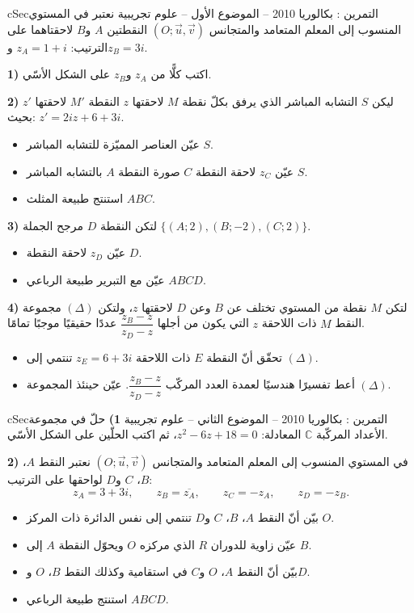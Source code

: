 \documentclass[12pt,a4paper]{article}
\newenvironment{BOX}[2]{\begin{otherlanguage}{english}\begin{arbox}{#1}{#2}}{\end{arbox}\end{otherlanguage}}
\newcounter{exo}
\newenvironment{tamrin}[1]{\stepcounter{exo}\begin{BOX}{cSec}{التمرين \theexo: #1}}{\end{BOX}}
\newenvironment{sq}{\begin{itemize}[leftmargin=2.4em,itemsep=3pt]}{\end{itemize}}
\newcommand{\qa}{\item[(أ)]}\newcommand{\qb}{\item[(ب)]}\newcommand{\qc}{\item[(جـ)]}\newcommand{\qd}{\item[(د)]}\newcommand{\qe}{\item[(هـ)]}
\begin{document}
\begin{tamrin}{بكالوريا 2010 -- الموضوع الأول -- علوم تجريبية}
نعتبر في المستوي المنسوب إلى المعلم المتعامد والمتجانس $(O;\vec u,\vec v)$ النقطتين $A$ و$B$ لاحقتاهما على الترتيب: $z_A=1+i$ و$z_B=3i$.

\textbf{1)} اكتب كلًّا من $z_A$ و$z_B$ على الشكل الأسّي.

\textbf{2)} ليكن $S$ التشابه المباشر الذي يرفق بكلّ نقطة $M$ لاحقتها $z$ النقطة $M'$ لاحقتها $z'$ بحيث: $z'=2iz+6+3i$.
\begin{sq}
\qa عيّن العناصر المميّزة للتشابه المباشر $S$.
\qb عيّن $z_C$ لاحقة النقطة $C$ صورة النقطة $A$ بالتشابه المباشر $S$.
\qc استنتج طبيعة المثلث $ABC$.
\end{sq}
\textbf{3)} لتكن النقطة $D$ مرجح الجملة $\{(A;2),(B;-2),(C;2)\}$.
\begin{sq}
\qa عيّن $z_D$ لاحقة النقطة $D$.
\qb عيّن مع التبرير طبيعة الرباعي $ABCD$.
\end{sq}
\textbf{4)} لتكن $M$ نقطة من المستوي تختلف عن $B$ وعن $D$ لاحقتها $z$، ولتكن $(\Delta)$ مجموعة النقط $M$ ذات اللاحقة $z$ التي يكون من أجلها $\dfrac{z_B-z}{z_D-z}$ عددًا حقيقيًا موجبًا تمامًا.
\begin{sq}
\qa تحقّق أنّ النقطة $E$ ذات اللاحقة $z_E=6+3i$ تنتمي إلى $(\Delta)$.
\qb أعط تفسيرًا هندسيًا لعمدة العدد المركّب $\dfrac{z_B-z}{z_D-z}$. عيّن حينئذ المجموعة $(\Delta)$.
\end{sq}
\end{tamrin}

\begin{tamrin}{بكالوريا 2010 -- الموضوع الثاني -- علوم تجريبية}
\textbf{1)} حلّ في مجموعة الأعداد المركّبة $\mathbb{C}$ المعادلة: $z^2-6z+18=0$، ثم اكتب الحلّين على الشكل الأسّي.

\textbf{2)} في المستوي المنسوب إلى المعلم المتعامد والمتجانس $(O;\vec u,\vec v)$ نعتبر النقط $A$، $B$، $C$ و$D$ لواحقها على الترتيب:
\[z_A=3+3i,\qquad z_B=\overline{z_A},\qquad z_C=-z_A,\qquad z_D=-z_B .\]
\begin{sq}
\qa بيّن أنّ النقط $A$، $B$، $C$ و$D$ تنتمي إلى نفس الدائرة ذات المركز $O$.
\qb عيّن زاوية للدوران $R$ الذي مركزه $O$ ويحوّل النقطة $A$ إلى $B$.
\qc بيّن أنّ النقط $A$، $O$ و$C$ في استقامية وكذلك النقط $B$، $O$ و$D$.
\qd استنتج طبيعة الرباعي $ABCD$.
\end{sq}
\end{tamrin}
\end{document}
